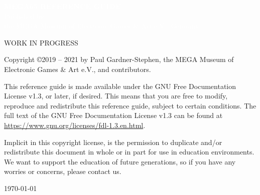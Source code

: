 





\cleardoublepage


\begin{titlepage}
    \pagecolor{blue}
     \begin{center}
       {
         \large
         \vspace*{2cm}
               {\Huge\textcolor{white}{\bf{MEGA65 REFERENCE GUIDE}}}\\
             \vspace{\fill}
                    {\textcolor{white}
                    {Published by \\ the MEGA Museum of Electronic Games \& Art e.V., Germany.}}
       }
     \end{center}
   \end{titlepage}

  \pagecolor{white}\textcolor{black}
  \vfill
  WORK IN PROGRESS

  Copyright \copyright 2019 -- 2021 by Paul Gardner-Stephen,
  the MEGA Museum of Electronic Games \& Art e.V.,
  and contributors.

  This reference guide is made available under the GNU Free Documentation
  License v1.3, or later, if desired. This means that you are free to
  modify, reproduce and redistribute this reference guide, subject to
  certain conditions. The full text of the GNU Free Documentation
  License v1.3 can be found at
  \url{https://www.gnu.org/licenses/fdl-1.3.en.html}.

  Implicit in this copyright license, is the permission to duplicate
  and/or redistribute this document in whole or in part for use in
  education environments. We want to support the education of future
  generations, so if you have any worries or concerns, please contact us.

   \par\today

